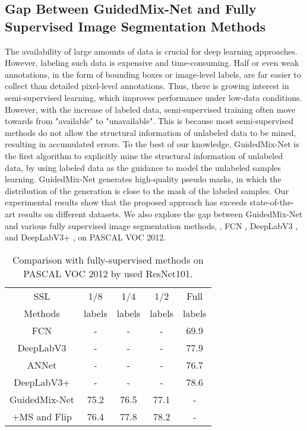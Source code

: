 \subsection{Gap Between GuidedMix-Net and Fully Supervised Image Segmentation Methods}
The availability of large amounts of data is crucial for deep learning approaches.
However, labeling such data is expensive and time-consuming.
Half or even weak annotations, in the form of bounding boxes or image-level labels, are far easier to collect than detailed pixel-level annotations. 
Thus, there is growing interest in semi-supervised learning, which improves performance under low-data conditions. 
However, with the increase of labeled data, semi-supervised training often move towards from "available" to "unavailable".
This is because most semi-supervised methods do not allow the structural information of unlabeled data to be mined, resulting in accumulated errors.
To the best of our knowledge, GuidedMix-Net is the first algorithm to explicitly mine the structural information of unlabeled data, by using labeled data as the guidance to model the unlabeled samples learning.
GuidedMix-Net generates high-quality pseudo masks, in which the distribution of the generation is close to the mask of the labeled samples.
Our experimental results show that the proposed approach has exceeds state-of-the-art results on different datasets.
We also explore the gap between GuidedMix-Net and various fully supervised image segmentation methods, , FCN \cite{long2015fully}, DeepLabV3 \cite{chen2017rethinking}, and DeepLabV3+ \cite{Chen2018EncoderDecoderWA}, on PASCAL VOC 2012.

\begin{table}[t!]
\small
\centering
\caption{Comparison with fully-supervised methods on PASCAL VOC 2012 by used ResNet101.}
\begin{tabular}{c|c|c|c|c}
\hline
	SSL & 1/8 & 1/4 & 1/2 & Full \\
	Methods & labels & labels & labels & labels \\\hline
	FCN \cite{long2015fully} & - & - & -  & 69.9 \\
	DeepLabV3 \cite{chen2017rethinking} & - & - & -  & 77.9 \\
	ANNet \cite{annn} & - & - & -  & 76.7 \\
	DeepLabV3+ \cite{Chen2018EncoderDecoderWA} & - & - & - & 78.6 \\\hline\hline
	GuidedMix-Net & 75.2 & 76.5 & 77.1  & - \\
	+MS and Flip & 76.4 & 77.8 & 78.2  & - \\\hline
\end{tabular}
\label{the gap}
\end{table}


